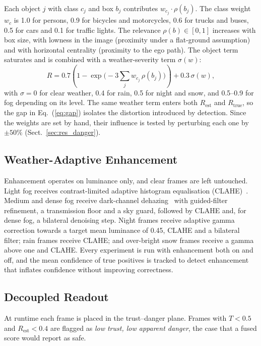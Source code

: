 \documentclass[pdflatex,sn-mathphys-num]{sn-jnl}
\newcommand{\Rtrue}{R_{\mathrm{true}}}
\newcommand{\Rest}{R_{\mathrm{est}}}
\begin{document}
Each object $j$ with class $c_j$ and box $b_j$ contributes $w_{c_j} \cdot \rho(b_j)$. The class weight $w_c$ is 1.0 for persons, 0.9 for bicycles and motorcycles, 0.6 for trucks and buses, 0.5 for cars and 0.1 for traffic lights. The relevance $\rho(b) \in [0,1]$ increases with box size, with lowness in the image (proximity under a flat-ground assumption) and with horizontal centrality (proximity to the ego path). The object term saturates and is combined with a weather-severity term $\sigma(w)$:
\begin{equation}
R = 0.7\left(1 - \exp\Big(-3\sum_j w_{c_j}\,\rho(b_j)\Big)\right) + 0.3\,\sigma(w),
\label{eq:danger}
\end{equation}
with $\sigma = 0$ for clear weather, 0.4 for rain, 0.5 for night and snow, and 0.5--0.9 for fog depending on its level. The same weather term enters both $\Rest$ and $\Rtrue$, so the gap in Eq.~(\ref{eq:gap}) isolates the distortion introduced by detection. Since the weights are set by hand, their influence is tested by perturbing each one by $\pm 50\%$ (Sect.~\ref{sec:res_danger}).

\subsection{Weather-Adaptive Enhancement}

Enhancement operates on luminance only, and clear frames are left untouched. Light fog receives contrast-limited adaptive histogram equalisation (CLAHE)~\cite{zuiderveld1994clahe}. Medium and dense fog receive dark-channel dehazing~\cite{he2011darkchannel} with guided-filter refinement, a transmission floor and a sky guard, followed by CLAHE and, for dense fog, a bilateral denoising step. Night frames receive adaptive gamma correction towards a target mean luminance of 0.45, CLAHE and a bilateral filter; rain frames receive CLAHE; and over-bright snow frames receive a gamma above one and CLAHE. Every experiment is run with enhancement both on and off, and the mean confidence of true positives is tracked to detect enhancement that inflates confidence without improving correctness.

\subsection{Decoupled Readout}

At runtime each frame is placed in the trust--danger plane. Frames with $T < 0.5$ and $\Rest < 0.4$ are flagged as \emph{low trust, low apparent danger}, the case that a fused score would report as safe.
\end{document}
